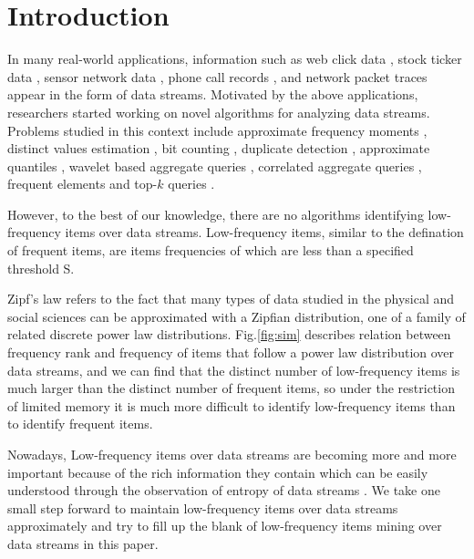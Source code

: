 \documentclass[conference]{IEEEtran}
\begin{document}
\section{Introduction}
In many real-world applications, information such as web click data \cite{IEEEexample:webdata}, stock ticker
data \cite{IEEEexample:stockticker,IEEEexample:stockticker2}, sensor network data \cite{IEEEexample:sensor}, phone call records \cite{IEEEexample:phonecall}, and network packet traces \cite{IEEEexample:packet} appear in the form of data streams. Motivated by the above applications, researchers started working on novel algorithms for analyzing data streams. Problems studied in this context include approximate frequency moments \cite{IEEEexample:frequencymoments}, distinct values estimation \cite{IEEEexample:distinctestimation,IEEEexample:distinctvalues}, bit counting \cite{IEEEexample:bitcounting}, duplicate detection \cite{IEEEexample:sbf,IEEEexample:duplicatedetec}, approximate quantiles \cite{IEEEexample:quantile}, wavelet based aggregate queries \cite{IEEEexample:wavelet}, correlated aggregate queries \cite{IEEEexample:correlated}, frequent elements \cite{IEEEexample:frequent1,IEEEexample:frequent2,IEEEexample:frequent3,IEEEexample:ldsketch} and top-$k$ queries \cite{IEEEexample:spacesaving,IEEEexample:top-k1}.\par
However, to the best of our knowledge, there are no algorithms identifying low-frequency items over data streams. Low-frequency items, similar to the defination of frequent items, are items frequencies of which are less than a specified threshold S. \par
Zipf's law refers to the fact that many types of data studied in the physical and social sciences can be approximated with a Zipfian distribution, one of a family of related discrete power law distributions. Fig.\ref{fig:sim} describes relation between frequency rank and frequency of items that follow a power law distribution over data streams, and we can find that the distinct number of low-frequency items is much larger than the distinct number of frequent items, so under the restriction of limited memory it is much more difficult to identify low-frequency items than to identify frequent items. \par
Nowadays, Low-frequency items over data streams are becoming more and more important because of the rich information they contain which can be easily understood through the observation of entropy of data streams \cite{IEEEexample:metropy}. We take one small step forward to maintain low-frequency items over data streams approximately and try to fill up the blank of low-frequency items mining over data streams in this paper.   
\end{document}
